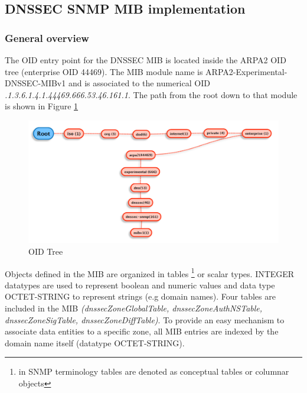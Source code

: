 \subsection{DNSSEC SNMP MIB implementation}
\label{section:dnssec-mib-implementation}

\subsubsection{General overview}
The OID entry point for the DNSSEC MIB is located inside the ARPA2 OID tree (enterprise OID 44469). The MIB module name is ARPA2-Experimental-DNSSEC-MIBv1 and is associated to the numerical OID \textit{.1.3.6.1.4.1.44469.666.53.46.161.1}. The path from the root down to that module is shown in Figure \ref{figure:oid-tree}

\begin{figure}[H]
\centering
\includegraphics[scale=0.4]{Images/oid-tree.pdf}
\caption{OID Tree}
\label{figure:oid-tree}
\end{figure}


Objects defined in the MIB are organized in tables \footnote{in SNMP terminology tables are denoted as conceptual tables or columnar objects} or scalar types. INTEGER datatypes are used to represent boolean and numeric values and data type  OCTET-STRING to represent strings (e.g domain names). Four tables are included in the MIB \textit{(dnssecZoneGlobalTable, dnssecZoneAuthNSTable, dnssecZoneSigTable, dnssecZoneDiffTable)}. To provide an easy mechanism to associate data entities to a specific zone, all MIB entries are indexed by the domain name itself (datatype OCTET-STRING).
\\
